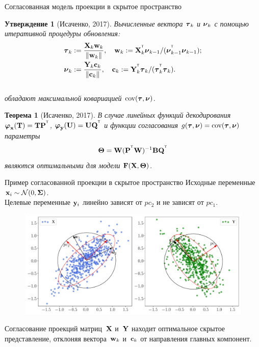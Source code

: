 \documentclass[10pt]{beamer}
\newtheorem{statement}{Утверждение}
\newtheorem{rustheorem}{Теорема}
\begin{document}
\begin{frame}{Согласованная модель проекции в скрытое пространство}
	\begin{statement}[Исаченко, 2017]
		Вычисленные вектора $\btau_k$ и $\bnu_k$ с помощью итеративной процедуры обновления:
		\vspace{-0.2cm}
		\begin{align*}
			\btau_k &:= \frac{\bX_k \bw_k}{\|\bw_k\|}, \quad  \bw_k := \bX_k^{\T} \bnu_{k-1} / (\bnu_{k-1}^{\T} \bnu_{k-1}); \\ 
			\bnu_k &:= \frac{\bY_k \bc_k}{\| \bc_k \|}, \quad \bc_k := \bY_k^{\T} \btau_k / (\btau_k^{\T} \btau_k).
		\end{align*}
		\vspace{-0.5cm} \\
		обладают максимальной ковариацией $\textnormal{cov}(\btau, \bnu)$.
	\end{statement}

	\begin{rustheorem}[Исаченко, 2017]
		В случае линейных функций декодирования $\bphi_\bx (\bT) = \bT \bP^{\T}$, $\bphi_\by (\bU) = \bU \bQ^{\T}$ и функции согласования $g(\btau, \bnu) = \textnormal{cov}(\btau, \bnu)$ параметры
		\[
		\bTheta = \bW (\bP^{\T} \bW)^{-1} \bB \bQ^{\T}
		\]
		являются оптимальными для модели $\bF(\bX, \bTheta)$.
	\end{rustheorem}
\end{frame}
\begin{frame}{Пример согласованной проекции в скрытое пространство}
	Исходные переменные $\bx_i \sim \mathcal{N}(0, \mathbf{\Sigma})$. \\ 
	Целевые переменные $\by_i$ линейно зависят от $pc_2$ и не зависят от $pc_1$.
	\begin{figure}[h]
	\centering
	\includegraphics[width=\linewidth]{figs/pls_toy_example}
	\end{figure}
	Согласование проекций матриц~$\bX$ и~$\bY$ находит оптимальное скрытое представление, отклоняя вектора~$\bw_k$ и~$\bc_k$ от направления главных компонент. 
\end{frame}
\end{document}
